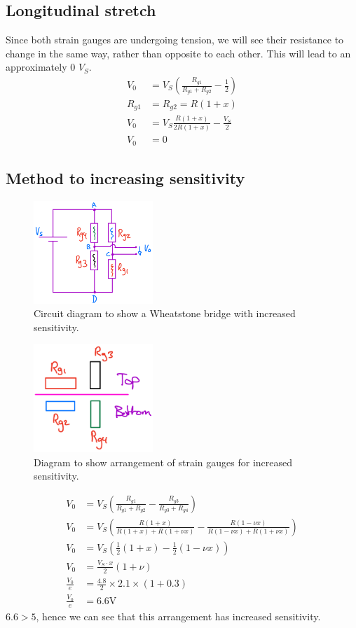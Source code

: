 \documentclass[12pt]{article}
\numberwithin{equation}{section}
\begin{document}
\subsection*{Longitudinal stretch}
Since both strain gauges are undergoing tension, we will see their resistance to change in the same way, rather than opposite to each other. This will lead to an approximately 0 $V_S$. 
\begin{align}
  V_0 &= V_S \left( \frac{R_{g1}}{R_{g1} + R_{g2}} - \frac{1}{2} \right)\\
  R_{g1} &= R_{g2} = R(1+x)\\
  V_0 &= V_S\frac{R(1+x)}{2R(1+x)} - \frac{V_S}{2}\\
  V_0 &= 0 
\end{align}
\subsection*{Method to increasing sensitivity}
\begin{figure}[H]
  \centering
  \includegraphics[width=0.4\textwidth]{./img/4-4circuit.png}
  \caption{Circuit diagram to show a Wheatstone bridge with increased sensitivity.}
\end{figure}
\begin{figure}[H]
  \centering
  \includegraphics[width=0.4\textwidth]{./img/4-4arrangement.png}
  \caption{Diagram to show arrangement of strain gauges for increased sensitivity.}
\end{figure}
\begin{align}
  V_0 &= V_S \left(\frac{R_{g1}}{R_{g1} + R_{g2}} - \frac{R_{g3}}{R_{g3} + R_{g4}}\right)\\
  V_0 &= V_S \left(\frac{R(1+x)}{R(1+x) + R(1+\nu x)} - \frac{R(1-\nu x)}{R(1-\nu x) + R(1+\nu x)}\right)\\
  V_0 &= V_S \left(\frac{1}{2}(1+x) - \frac{1}{2}(1-\nu x)\right)\\
  V_0 &= \frac{V_S \cdot x}{2} \left(1 + \nu \right)\\
  \frac{V_0}{e} &= \frac{4.8}{2} \times 2.1\times  (1 + 0.3)\\
  \frac{V_0}{e} &= 6.6 \si{\volt}
\end{align}
$6.6 > 5$, hence we can see that this arrangement has increased sensitivity.
\end{document}
